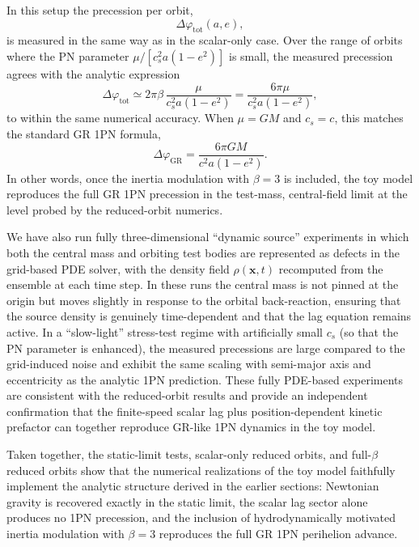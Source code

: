 \documentclass[11pt]{article}
\newcommand{\cS}{c_s}
\begin{document}
In this setup the precession per orbit,
\begin{equation}
  \Delta \varphi_{\mathrm{tot}}(a,e),
\end{equation}
is measured in the same way as in the scalar-only case. Over the range of orbits where the PN parameter $\mu/[\cS^2 a(1-e^2)]$ is small, the measured precession agrees with the analytic expression
\begin{equation}
  \Delta \varphi_{\mathrm{tot}}
  \simeq 2\pi\beta\,\frac{\mu}{\cS^2 a (1-e^2)}
  = \frac{6\pi \mu}{\cS^2 a (1-e^2)},
\end{equation}
to within the same numerical accuracy. When $\mu = GM$ and $\cS = c$, this matches the standard GR 1PN formula,
\begin{equation}
  \Delta \varphi_{\mathrm{GR}}
  = \frac{6\pi GM}{c^2 a (1-e^2)}.
\end{equation}
In other words, once the inertia modulation with $\beta = 3$ is included, the toy model reproduces the full GR 1PN precession in the test-mass, central-field limit at the level probed by the reduced-orbit numerics.

We have also run fully three-dimensional ``dynamic source'' experiments in which both the central mass and orbiting test bodies are represented as defects in the grid-based PDE solver, with the density field $\rho(\mathbf{x},t)$ recomputed from the ensemble at each time step. In these runs the central mass is not pinned at the origin but moves slightly in response to the orbital back-reaction, ensuring that the source density is genuinely time-dependent and that the lag equation remains active. In a ``slow-light'' stress-test regime with artificially small $\cS$ (so that the PN parameter is enhanced), the measured precessions are large compared to the grid-induced noise and exhibit the same scaling with semi-major axis and eccentricity as the analytic 1PN prediction. These fully PDE-based experiments are consistent with the reduced-orbit results and provide an independent confirmation that the finite-speed scalar lag plus position-dependent kinetic prefactor can together reproduce GR-like 1PN dynamics in the toy model.

Taken together, the static-limit tests, scalar-only reduced orbits, and full-$\beta$ reduced orbits show that the numerical realizations of the toy model faithfully implement the analytic structure derived in the earlier sections: Newtonian gravity is recovered exactly in the static limit, the scalar lag sector alone produces no 1PN precession, and the inclusion of hydrodynamically motivated inertia modulation with $\beta = 3$ reproduces the full GR 1PN perihelion advance.
\end{document}
